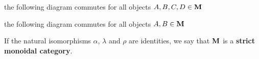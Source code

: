 \begin{definition}
\begin{defenum}
    \item the following diagram commutes for all objects \( A, B, C, D \in \operatorname{\mathbf{M}} \)
    \begin{Center}
    \end{Center}

    \item the following diagram commutes for all objects \( A, B \in \operatorname{\mathbf{M}} \)
    \begin{Center}
    \end{Center}
  \end{defenum}

  If the natural isomorphisms \( \alpha \), \( \lambda \) and \( \rho \) are identities, we say that \( \operatorname{\mathbf{M}} \) is a \textbf{strict monoidal category}.
\end{definition}

